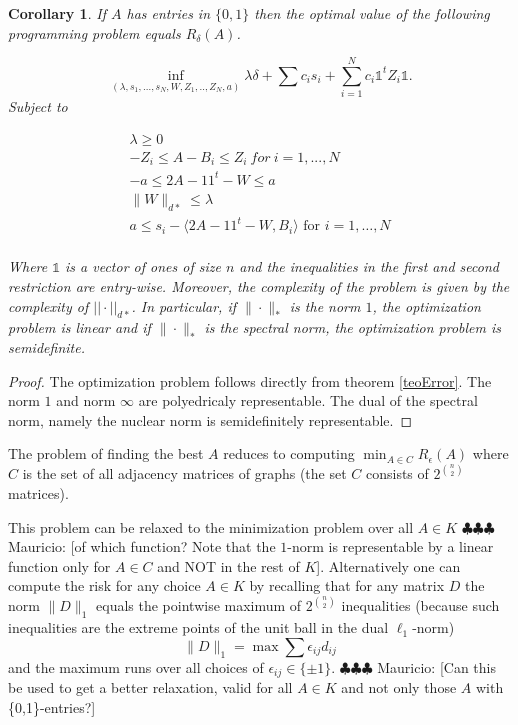 \documentclass[12pt]{amsart}
\newtheorem{cor}[lemma]{Corollary}
\numberwithin{equation}{section}
\newcommand{\mv}[1]{{\color{red} \sf $\clubsuit\clubsuit\clubsuit$ Mauricio: [#1]}}
\newcommand{\ddr}[1]{{\color{blue} \sf $\clubsuit\clubsuit\clubsuit$ Daniel: [#1]}}
\begin{document}
\begin{cor} If $A$ has entries in $\{0,1\}$ then the optimal value of the following  programming problem equals $R_{\delta}(A)$.

\[
 \inf_{(\lambda,s_1,\dots, s_N,W,Z_1,..,Z_N,a)} \lambda\delta +\sum c_is_i + \sum_{i=1}^N c_i \mathds{1}^t Z_i \mathds{1}.
\]
Subject to
\begin{center}
\[
\begin{array}{l}
\lambda \geq 0\\
-Z_i \leq A-B_i  \leq Z_i \ for \ i=1,...,N\\
-a \leq 2A-11^t-W \leq a \\
\|W\|_{d*}\leq \lambda\\
a\leq s_i-\langle 2A-11^t-W, B_i\rangle\text{ for $i=1,\dots, N$}\\
\end{array}
\]
\end{center}


Where $\mathds{1}$ is a vector of ones of size $n$ and the inequalities in the first and second restriction are entry-wise. Moreover, the complexity of the problem is given by the complexity of $||\cdot||_{d*}$. In particular, if $\|\cdot\|_*$ is the norm $1$, the optimization problem is linear and if  $\|\cdot\|_*$ is the spectral norm, the optimization problem is semidefinite.  
\end{cor}
\begin{proof}
The optimization problem follows directly from theorem \ref{teoError}. The norm $1$ and norm $\infty$ are polyedricaly representable. The dual of the spectral norm, namely the nuclear norm is semidefinitely representable.
\end{proof}


The problem of finding the best $A$ reduces to computing $\min_{A\in C} R_{\epsilon}(A)$ where $C$ is the set of all adjacency matrices of graphs (the set $C$ consists of $2^{\binom{n}{2}}$ matrices). 

This problem can be relaxed to the minimization problem over all $A\in K$ \mv{of which function? Note that the $1$-norm is representable by a linear function only for $A\in C$ and NOT in the rest of $K$}. Alternatively one can compute the risk for any choice $A\in K$ by recalling that for any matrix $D$ the norm $\|D\|_1$ equals the pointwise maximum of $2^{\binom{n}{2}}$ inequalities (because such inequalities are the extreme points of the unit ball in the dual $\ell_1$-norm)
\[\|D\|_1=\max \sum \epsilon_{ij}d_{ij}\]
and the maximum runs over all choices of $\epsilon_{ij}\in\{\pm 1\}$.
\mv{Can this be used to get a better relaxation, valid for all $A\in K$ and not only those $A$ with \{0,1\}-entries?}
\end{document}
